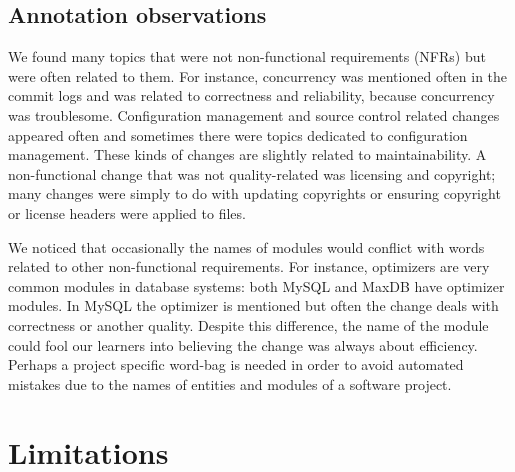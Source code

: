 \documentclass[]{sig-alternate}
\begin{document}
\subsection{Annotation observations}

We found many topics that were not non-functional requirements (NFRs) but were often related to them. For instance, concurrency was mentioned often in the commit logs and was related to correctness and reliability, because concurrency was troublesome. Configuration management and source control related changes appeared often and sometimes there were topics dedicated to configuration management. These kinds of changes are slightly related to maintainability. A non-functional change that was not quality-related was licensing and copyright; many changes were simply to do with updating copyrights or ensuring copyright or license headers were applied to files.

We noticed that occasionally the names of modules would conflict with words related to other non-functional requirements. For instance, optimizers are very common modules in database systems: both MySQL and MaxDB have optimizer modules. In MySQL the optimizer is mentioned but often the change deals with correctness or another quality. Despite this difference, the name of the module could fool our learners into believing the change was always about efficiency. Perhaps a project specific word-bag is needed in order to avoid automated mistakes due to the names of entities and modules of a software project.

\section{Limitations}
\end{document}
